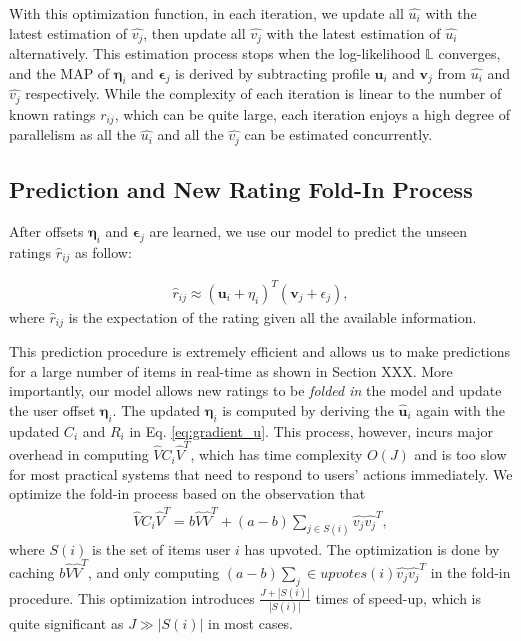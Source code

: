 \documentclass[conference]{IEEEtran}
\begin{document}
With this optimization function, in each iteration, we update all $\hat{u_i}$ with the latest estimation of $\hat{v_j}$, then update all $\hat{v_j}$ with the latest estimation of $\hat{u_i}$ alternatively. This estimation process stops when the log-likelihood $\mathbb{L}$ converges, and the MAP of $\mathbf{\eta}_i$ and $\mathbf{\epsilon}_j$ is derived by subtracting profile $\mathbf{u}_i$ and $\mathbf{v}_j$ from $\hat{u_i}$ and $\hat{v_j}$ respectively. While the complexity of each iteration is linear to the number of known ratings $r_{ij}$, which can be quite large, each iteration enjoys a high degree of parallelism as all the $\hat{u_i}$ and all the $\hat{v_j}$ can be estimated concurrently.

\subsection{Prediction and New Rating Fold-In Process}\label{sec:fold-in}
After offsets $\mathbf{\eta}_i$ and $\mathbf{\epsilon}_j$ are learned, we use our model to predict the unseen ratings $\hat{r}_{ij}$ as follow:

\begin{eqnarray}\label{eq:r_estimated}
\hat{r}_{ij} \approx (\mathbf{u}_i+\eta_i)^T(\mathbf{v}_j+\epsilon_j),
\end{eqnarray} where $\hat{r}_{ij}$ is the expectation of the rating given all the available information.

This prediction procedure is extremely efficient and allows us to make predictions for a large number of items in real-time as shown in Section XXX. More importantly, our model allows new ratings to be \textit{folded in} the model and update the user offset $\mathbf{\eta}_i$. The updated $\mathbf{\eta}_i$ is computed by deriving the $\hat{\mathbf{u}}_i$ again with the updated $C_i$ and $R_i$ in Eq. \ref{eq:gradient_u}. This process, however, incurs major overhead in computing $\hat{V}C_i\hat{V}^T$, which has time complexity $O(J)$ and is too slow for most practical systems that need to respond to users' actions immediately. We optimize the fold-in process based on the observation that 
\begin{eqnarray}
\hat{V}C_i\hat{V}^T = b\hat{V}\hat{V}^T + (a-b)\sum\limits_{j\in S(i)} \hat{v_j}\hat{v_j}^T,
\end{eqnarray}
where $S(i)$ is the set of items user $i$ has upvoted. The optimization is done by caching $b\hat{V}\hat{V}^T$, and only computing $(a-b)\sum_j\in upvotes(i) \hat{v_j}\hat{v_j}^T$ in the fold-in procedure. This optimization introduces $\frac{J+|S(i)|}{|S(i)|}$ times of speed-up, which is quite significant as $J \gg |S(i)|$ in most cases.
\end{document}
